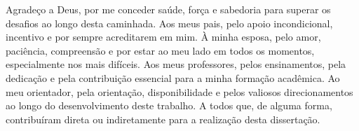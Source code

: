 \begin{agradecimentos}
Agradeço a Deus, por me conceder saúde, força e sabedoria para superar os desafios ao longo desta caminhada.
Aos meus pais, pelo apoio incondicional, incentivo e por sempre acreditarem em mim.
À minha esposa, pelo amor, paciência, compreensão e por estar ao meu lado em todos os momentos, especialmente nos mais difíceis.
Aos meus professores, pelos ensinamentos, pela dedicação e pela contribuição essencial para a minha formação acadêmica.
Ao meu orientador, pela orientação, disponibilidade e pelos valiosos direcionamentos ao longo do desenvolvimento deste trabalho.
A todos que, de alguma forma, contribuíram direta ou indiretamente para a realização desta dissertação.

\end{agradecimentos}